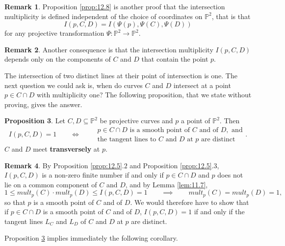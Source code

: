 \documentclass{article}
\renewcommand{\P}{\mathbb{P}}
\newcommand{\rb}[1]{\left( #1 \right)}
\theoremstyle{definition}\newtheorem{definition}{Definition}[section]
\theoremstyle{definition}\newtheorem{notation}[definition]{Notation}
\theoremstyle{definition}\newtheorem{remark}[definition]{Remark}
\theoremstyle{definition}\newtheorem{example1}[definition]{Example}
\theoremstyle{definition}\newtheorem{fact}{Fact}
\theoremstyle{definition}\newtheorem{exercise}{Exercise}
\theoremstyle{definition}\newtheorem*{example2}{Example}
\newtheorem{proposition}[definition]{Proposition}
\begin{document}
\begin{remark}
Proposition \ref{prop:12.8} is another proof that the intersection multiplicity is defined independent of the choice of coordinates on $ \P^2 $, that is that
$$ I\rb{p, C, D} = I\rb{\Psi\rb{p}, \Psi\rb{C}, \Psi\rb{D}} $$
for any projective transformation $ \Psi : \P^2 \to \P^2 $.
\end{remark}

\begin{remark}
Another consequence is that the intersection multiplicity $ I\rb{p, C, D} $ depends only on the components of $ C $ and $ D $ that contain the point $ p $.
\end{remark}

The intersection of two distinct lines at their point of intersection is one. The next question we could ask is, when do curves $ C $ and $ D $ intersect at a point $ p \in C \cap D $ with multiplicity one? The following proposition, that we state without proving, gives the answer.

\begin{proposition}
\label{prop:12.11}
Let $ C, D \subseteq \P^2 $ be projective curves and $ p $ a point of $ \P^2 $. Then
$$ I\rb{p, C, D} = 1 \qquad \iff \qquad \begin{array}{c}
p \in C \cap D \text{ is a smooth point of } C \text{ and of } D, \text{ and} \\
\text{the tangent lines to } C \text{ and } D \text{ at } p \text{ are distinct}
\end{array}. $$
$ C $ and $ D $ meet \textbf{transversely} at $ p $.
\end{proposition}

\begin{remark}
By Proposition \ref{prop:12.5}.$ 2 $ and Proposition \ref{prop:12.5}.$ 3 $, $ I\rb{p, C, D} $ is a non-zero finite number if and only if $ p \in C \cap D $ and $ p $ does not lie on a common component of $ C $ and $ D $, and by Lemma \ref{lem:11.7},
$$ 1 \le mult_p\rb{C} \cdot mult_p\rb{D} \le I\rb{p, C, D} = 1 \qquad \implies \qquad mult_p\rb{C} = mult_p\rb{D} = 1, $$
so that $ p $ is a smooth point of $ C $ and of $ D $. We would therefore have to show that if $ p \in C \cap D $ is a smooth point of $ C $ and of $ D $, $ I\rb{p, C, D} = 1 $ if and only if the tangent lines $ L_C $ and $ L_D $ of $ C $ and $ D $ at $ p $ are distinct.
\end{remark}

Proposition \ref{prop:12.11} implies immediately the following corollary.
\end{document}
